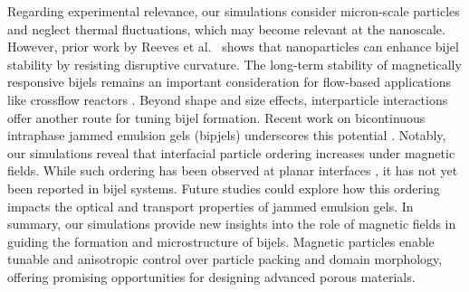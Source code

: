 Regarding experimental relevance, our simulations consider micron-scale particles and neglect thermal fluctuations, which may become relevant at the 
nanoscale. However, prior work by Reeves et al.~\cite{reeves_particle-size_2015} shows that nanoparticles can enhance bijel stability by resisting 
disruptive curvature. The long-term stability of magnetically responsive bijels remains an important consideration for flow-based applications like 
crossflow reactors \cite{khan_nanostructured_2022}.
Beyond shape and size effects, interparticle interactions offer another route for tuning bijel formation. Recent work on bicontinuous intraphase jammed 
emulsion gels (bipjels) underscores this potential \cite{kinkead_bicontinuous_2019}. Notably, our simulations reveal that interfacial particle ordering 
increases under magnetic fields. While such ordering has been observed at planar interfaces 
\cite{toor_self-assembly_2016, shi_nanoparticle_2018, kim_dynamic_2022}, it has not yet been reported in bijel systems. Future studies could explore how 
this ordering impacts the optical and transport properties of jammed emulsion gels.
In summary, our simulations provide new insights into the role of magnetic fields in guiding the formation and microstructure of bijels. Magnetic particles 
enable tunable and anisotropic control over particle packing and domain morphology, offering promising opportunities for designing advanced porous materials.    

